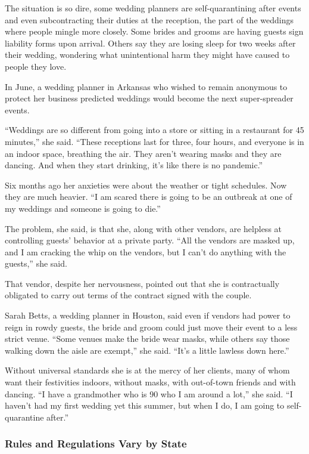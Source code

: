The situation is so dire, some wedding planners are self-quarantining
after events and even subcontracting their duties at the reception, the
part of the weddings where people mingle more closely. Some brides and
grooms are having guests sign liability forms upon arrival. Others say
they are losing sleep for two weeks after their wedding, wondering what
unintentional harm they might have caused to people they love.

In June, a wedding planner in Arkansas who wished to remain anonymous to
protect her business predicted weddings would become the next
super-spreader events.

``Weddings are so different from going into a store or sitting in a
restaurant for 45 minutes,'' she said. ``These receptions last for
three, four hours, and everyone is in an indoor space, breathing the
air. They aren't wearing masks and they are dancing. And when they start
drinking, it's like there is no pandemic.''

Six months ago her anxieties were about the weather or tight schedules.
Now they are much heavier. ``I am scared there is going to be an
outbreak at one of my weddings and someone is going to die.''

The problem, she said, is that she, along with other vendors, are
helpless at controlling guests' behavior at a private party. ``All the
vendors are masked up, and I am cracking the whip on the vendors, but I
can't do anything with the guests,'' she said.

That vendor, despite her nervousness, pointed out that she is
contractually obligated to carry out terms of the contract signed with
the couple.

Sarah Betts, a wedding planner in Houston, said even if vendors had
power to reign in rowdy guests, the bride and groom could just move
their event to a less strict venue. ``Some venues make the bride wear
masks, while others say those walking down the aisle are exempt,'' she
said. ``It's a little lawless down here.''

Without universal standards she is at the mercy of her clients, many of
whom want their festivities indoors, without masks, with out-of-town
friends and with dancing. ``I have a grandmother who is 90 who I am
around a lot,'' she said. ``I haven't had my first wedding yet this
summer, but when I do, I am going to self-quarantine after.''

\hypertarget{rules-and-regulations-vary-by-state}{%
\subsubsection{\texorpdfstring{\textbf{Rules and Regulations Vary by
State}}{Rules and Regulations Vary by State}}\label{rules-and-regulations-vary-by-state}}

